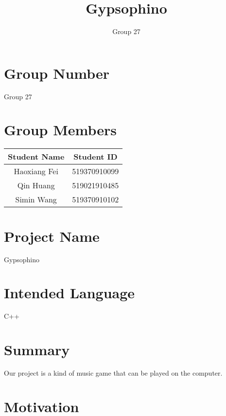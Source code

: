\documentclass[12pt, a4paper]{article}
\title{\Huge{Gypsophino}}
\author{Group 27}
\date{}
\begin{document}
\begin{titlepage}
  \maketitle
\end{titlepage}

\tableofcontents
\clearpage

\section{Group Number}

Group 27

\section{Group Members}

\begin{table}[h]
  \centering
  \begin{tabular}{cc}
    \toprule
    Student Name & Student ID\\
    \midrule
    Haoxiang Fei & 519370910099\\
    Qin Huang & 519021910485\\
    Simin Wang & 519370910102\\
    \bottomrule
  \end{tabular}
\end{table}

\section{Project Name}

Gypsophino

\section{Intended Language}

C++

\section{Summary}

Our project is a kind of music game that can be played on the computer.

\section{Motivation}
\end{document}
